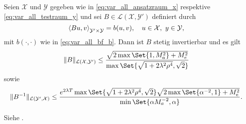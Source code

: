 \begin{Satz}
    \label{thm:schwab09:theorem51}
    Seien $\mathcal X$ und $\mathcal Y$ gegeben wie in \eqref{eq:var_all_ansatzraum_x} respektive \eqref{eq:var_all_testraum_y} und sei $B \in \mathcal L(\mathcal X, \mathcal Y')$ definiert durch
    \begin{equation}
        \label{eq:var_all_gross_b}
        \left\langle B u,v\right\rangle_{\mathcal Y' \times \mathcal Y} = b(u, v), \quad u \in \mathcal X,~y \in \mathcal Y,
    \end{equation}
    mit $b(\cdot, \cdot)$ wie in \eqref{eq:var_all_bf_b}.
    Dann ist $B$ stetig invertierbar und es gilt
    \begin{equation}
        \label{eq:var_all_norm_B}
        \norm{B}_{\mathcal L(\mathcal X, \mathcal Y')} \leq \frac{\sqrt{2\max\Set{1, M_{a}^{2}} + M_{e}^{2}}}{\max\Set{\sqrt{1 + 2 \lambda^{2} \rho^{4}}, \sqrt{2}}}
    \end{equation}
    sowie
    \begin{equation}
        \label{eq:var_all_norm_B_inv}
        \norm{B^{-1}}_{\mathcal L(\mathcal Y', \mathcal X)} \leq \frac{e^{2 \lambda T} \max\Set{\sqrt{1 + 2 \lambda^{2} \rho^{4}}, \sqrt{2}} \sqrt{2 \max\Set{ \alpha^{-2}, 1} + M_{e}^{2}}}{\min\Set{\alpha M_{a}^{-2}, \alpha}}.
    \end{equation}

    \begin{Beweis}
        Siehe \cite[Appendix A]{Schwab:2009ec}.



\end{Beweis}
\end{Satz}
